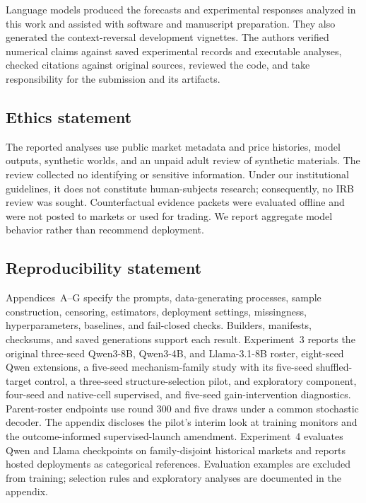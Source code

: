 \documentclass{article}
\begin{document}
Language models produced the forecasts and experimental responses analyzed in this
work and assisted with software and manuscript preparation. They also generated
the context-reversal development vignettes. The authors verified
numerical claims against saved experimental records and executable analyses, checked
citations against original sources, reviewed the code, and take responsibility for
the submission and its artifacts.

\subsection*{Ethics statement}

The reported analyses use public market metadata and price histories, model
outputs, synthetic worlds, and an unpaid adult review of synthetic materials. The
review collected no identifying or sensitive information. Under our institutional
guidelines, it does not constitute human-subjects research; consequently, no IRB
review was sought. Counterfactual evidence packets were evaluated offline and were
not posted to markets or used for trading. We report aggregate model behavior
rather than recommend deployment.

\subsection*{Reproducibility statement}
Appendices~A--G specify the prompts, data-generating processes, sample construction,
censoring, estimators, deployment settings, missingness, hyperparameters, baselines,
and fail-closed checks. Builders, manifests, checksums, and saved generations support
each result. Experiment~3 reports the original three-seed Qwen3-8B, Qwen3-4B,
and Llama-3.1-8B roster, eight-seed Qwen extensions, a five-seed mechanism-family
study with its five-seed shuffled-target control, a three-seed structure-selection pilot, and exploratory component,
four-seed and native-cell supervised, and five-seed gain-intervention diagnostics. Parent-roster endpoints use
round 300 and five draws under a common stochastic decoder. The appendix
discloses the pilot's interim look at training monitors and the outcome-informed
supervised-launch amendment.
Experiment~4 evaluates Qwen and Llama checkpoints on family-disjoint historical
markets and reports hosted deployments as categorical references. Evaluation
examples are excluded from training; selection rules and exploratory analyses
are documented in the appendix.
\end{document}

